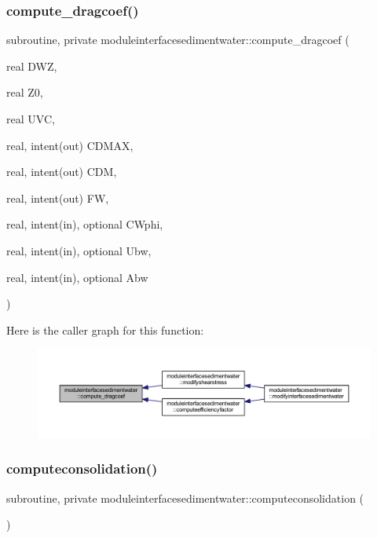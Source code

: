 \subsubsection{\texorpdfstring{compute\+\_\+dragcoef()}{compute\_dragcoef()}}
{\footnotesize\ttfamily subroutine, private moduleinterfacesedimentwater\+::compute\+\_\+dragcoef (\begin{DoxyParamCaption}\item[{real}]{D\+WZ,  }\item[{real}]{Z0,  }\item[{real}]{U\+VC,  }\item[{real, intent(out)}]{C\+D\+M\+AX,  }\item[{real, intent(out)}]{C\+DM,  }\item[{real, intent(out)}]{FW,  }\item[{real, intent(in), optional}]{C\+Wphi,  }\item[{real, intent(in), optional}]{Ubw,  }\item[{real, intent(in), optional}]{Abw }\end{DoxyParamCaption})\hspace{0.3cm}{\ttfamily [private]}}

Here is the caller graph for this function\+:\nopagebreak
\begin{figure}[H]
\begin{center}
\leavevmode
\includegraphics[width=350pt]{namespacemoduleinterfacesedimentwater_ab7293afe1dc4a5090663cd0d773d6e88_icgraph}
\end{center}
\end{figure}
\mbox{\label{namespacemoduleinterfacesedimentwater_a488a986c36aca3233969de75a2e2094e}} 
\subsubsection{\texorpdfstring{computeconsolidation()}{computeconsolidation()}}
{\footnotesize\ttfamily subroutine, private moduleinterfacesedimentwater\+::computeconsolidation (\begin{DoxyParamCaption}{ }\end{DoxyParamCaption})\hspace{0.3cm}{\ttfamily [private]}}

